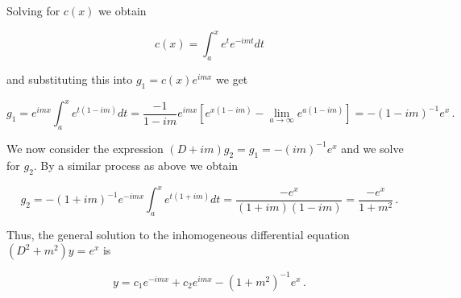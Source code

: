 \documentclass[a4paper]{article}
\numberwithin{equation}{section}
\begin{document}
\begin{description}
Solving for $c(x)$ we obtain

$$c(x) = \int_{a}^x e^te^{-imt}dt $$

and substituting this into $g_1 = c(x)e^{imx}$ we get

$$g_1 = e^{imx}\int_{a}^x e^{t(1-im)}dt = \frac{-1}{1-im}e^{imx}[ e^{x(1-im)} - \lim_{a \rightarrow \infty} e^{a(1-im)}] = -(1-im)^{-1}e^x\,.$$

We now consider the expression $(D+im)g_2 = g_1 = -(im)^{-1}e^x$ and we solve for $g_2$. By a similar process as above we obtain

$$g_2 = -(1+im)^{-1}e^{-imx}\int_{a}^x e^{t(1+im)}dt = \frac{-e^x}{(1+im)(1-im)} = \frac{-e^x}{1+m^2}\,.$$

Thus, the general solution to the inhomogeneous differential equation $(D^2 + m^2)y = e^x$ is

$$y = c_1e^{-imx} + c_2e^{imx} - (1+m^2)^{-1}e^x\,.$$




\end{description}
\end{document}
